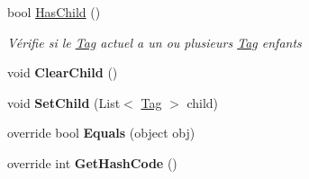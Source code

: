 \begin{DoxyCompactItemize}
bool \mbox{\hyperlink{class_m_t_connect_agent_1_1_model_1_1_tag_a0c2f62177d2c1c2db233e2adaef5a54c}{Has\+Child}} ()
\begin{DoxyCompactList}\small\item\em Vérifie si le \mbox{\hyperlink{class_m_t_connect_agent_1_1_model_1_1_tag}{Tag}} actuel a un ou plusieurs \mbox{\hyperlink{class_m_t_connect_agent_1_1_model_1_1_tag}{Tag}} enfants \end{DoxyCompactList}\item 
\mbox{\label{class_m_t_connect_agent_1_1_model_1_1_tag_aa8b2a0cdde372d0807a65c4e2f8d6eb3}} 
void {\bfseries Clear\+Child} ()
\item 
\mbox{\label{class_m_t_connect_agent_1_1_model_1_1_tag_ade18884a935ab5ad28d33510fa0ea4c5}} 
void {\bfseries Set\+Child} (List$<$ \mbox{\hyperlink{class_m_t_connect_agent_1_1_model_1_1_tag}{Tag}} $>$ child)
\item 
\mbox{\label{class_m_t_connect_agent_1_1_model_1_1_tag_aa32ef3799aad040e97a9d2f49b93a1b9}} 
override bool {\bfseries Equals} (object obj)
\item 
\mbox{\label{class_m_t_connect_agent_1_1_model_1_1_tag_ad7cead371724ffe7dccca547548c65b4}} 
override int {\bfseries Get\+Hash\+Code} ()
\end{DoxyCompactItemize}
